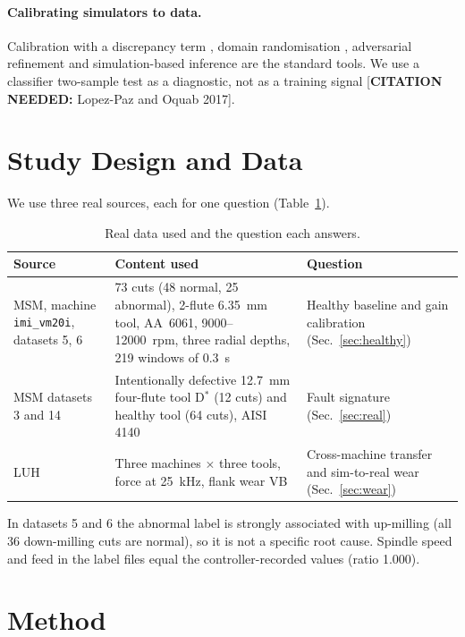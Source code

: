 \documentclass[11pt]{article}
\newcommand{\cn}[1]{{\color{orange}[\textbf{CITATION NEEDED:} #1]}}
\begin{document}
\paragraph{Calibrating simulators to data.}
Calibration with a discrepancy term \citep{kennedy2001}, domain randomisation \citep{tobin2017}, adversarial refinement \citep{shrivastava2017} and simulation-based inference \citep{cranmer2020} are the standard tools. We use a classifier two-sample test as a diagnostic, not as a training signal \cn{Lopez-Paz and Oquab 2017}.

\section{Study Design and Data}\label{sec:data}
We use three real sources, each for one question (Table~\ref{tab:data}).
\begin{table}[t]\centering\small
\caption{Real data used and the question each answers.}\label{tab:data}
\begin{tabular}{p{3.2cm}p{5.8cm}p{5.2cm}}\toprule
Source & Content used & Question\\\midrule
MSM, machine \texttt{imi\_vm20i}, datasets 5, 6 \citep{kim2026msm} & 73 cuts (48 normal, 25 abnormal), 2-flute 6.35~mm tool, AA~6061, 9000--12000~rpm, three radial depths, 219 windows of 0.3~s & Healthy baseline and gain calibration (Sec.~\ref{sec:healthy})\\
MSM datasets 3 and 14 & Intentionally defective 12.7~mm four-flute tool D$^*$ (12 cuts) and healthy tool (64 cuts), AISI 4140 & Fault signature (Sec.~\ref{sec:real})\\
LUH \citep{denkena2023luh} & Three machines $\times$ three tools, force at 25~kHz, flank wear VB & Cross-machine transfer and sim-to-real wear (Sec.~\ref{sec:wear})\\\bottomrule
\end{tabular}
\end{table}
In datasets 5 and 6 the abnormal label is strongly associated with up-milling (all 36 down-milling cuts are normal), so it is not a specific root cause. Spindle speed and feed in the label files equal the controller-recorded values (ratio 1.000).

\section{Method}\label{sec:method}
\end{document}
